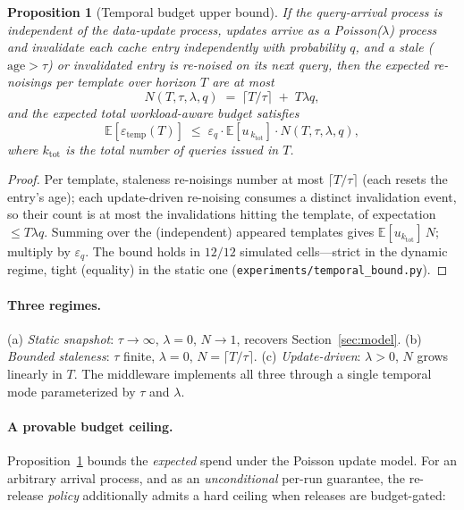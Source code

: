 \documentclass[sigconf,nonacm]{acmart}
\newcommand{\eps}{\varepsilon}
\newcommand{\E}{\mathbb{E}}
\newtheorem{prop}{Proposition}
\begin{document}
\begin{prop}[Temporal budget upper bound]
\label{prop:temporal}
If the query-arrival process is independent of the data-update process, updates arrive as a Poisson($\lambda$) process and invalidate each cache entry independently with probability $q$, and a stale ($\mathrm{age}>\tau$) or invalidated entry is re-noised on its next query, then the expected re-noisings per template over horizon $T$ are at most
\[
N(T,\tau,\lambda,q) \;=\; \lceil T/\tau \rceil \;+\; T\lambda q,
\]
and the expected total workload-aware budget satisfies
\[
\E[\eps_{\mathrm{temp}}(T)] \;\le\; \eps_q \cdot \E[u_{\,k_{\mathrm{tot}}}] \cdot N(T,\tau,\lambda,q),
\]
where $k_{\mathrm{tot}}$ is the total number of queries issued in $T$.
\end{prop}
\begin{proof}
Per template, staleness re-noisings number at most $\lceil T/\tau\rceil$ (each resets the entry's age); each update-driven re-noising consumes a distinct invalidation event, so their count is at most the invalidations hitting the template, of expectation $\le T\lambda q$. Summing over the (independent) appeared templates gives $\E[u_{k_{\mathrm{tot}}}]\,N$; multiply by $\eps_q$. The bound holds in $12/12$ simulated cells---strict in the dynamic regime, tight (equality) in the static one (\texttt{experiments/temporal\_bound.py}). \end{proof}

\paragraph{Three regimes.} (a) \emph{Static snapshot}: $\tau \to \infty$, $\lambda=0$, $N \to 1$, recovers Section~\ref{sec:model}. (b) \emph{Bounded staleness}: $\tau$ finite, $\lambda = 0$, $N = \lceil T/\tau \rceil$. (c) \emph{Update-driven}: $\lambda>0$, $N$ grows linearly in $T$. The middleware implements all three through a single temporal mode parameterized by $\tau$ and $\lambda$.

\paragraph{A provable budget ceiling.} Proposition~\ref{prop:temporal} bounds the \emph{expected} spend under the Poisson update model. For an arbitrary arrival process, and as an \emph{unconditional} per-run guarantee, the re-release \emph{policy} additionally admits a hard ceiling when releases are budget-gated:
\end{document}
